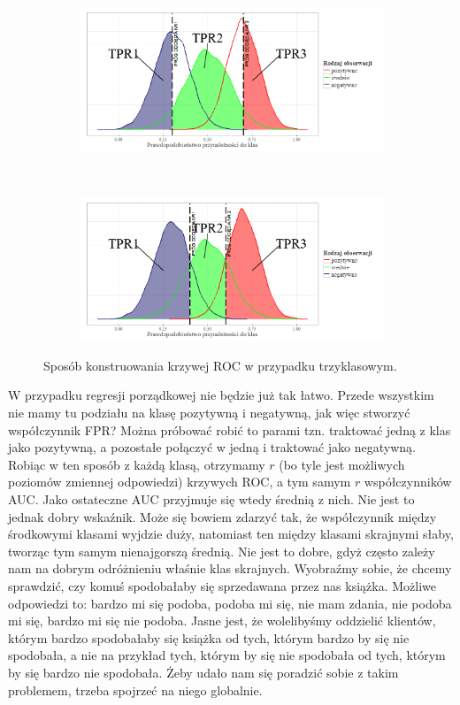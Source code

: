 \documentclass{mini}
\begin{document}
\begin{figure}[h]
	\begin{center}
  \begin{subfigure}[h]{\textwidth}
    \includegraphics[width=\textwidth]{roc_trzy1.png}
  \end{subfigure}\\
  \begin{subfigure}[h]{\textwidth}
    \includegraphics[width=\textwidth]{roc_trzy2.png}
  \end{subfigure}
  \end{center}
  \caption{Sposób konstruowania krzywej ROC w przypadku trzyklasowym.}
  \label{trzyklasowy}
\end{figure}

W przypadku regresji porządkowej nie będzie już tak łatwo. Przede wszystkim nie mamy tu podziału na klasę pozytywną i negatywną, jak więc stworzyć współczynnik FPR? Można próbować robić to parami tzn. traktować jedną z klas jako pozytywną, a pozostałe połączyć w jedną i traktować jako negatywną. Robiąc w ten sposób z każdą klasą, otrzymamy $r$ (bo tyle jest możliwych poziomów zmiennej odpowiedzi) krzywych ROC, a tym samym $r$ współczynników AUC. Jako ostateczne AUC przyjmuje się wtedy średnią z nich. Nie jest to jednak dobry wskaźnik. Może się bowiem zdarzyć tak, że współczynnik między środkowymi klasami wyjdzie duży, natomiast ten między klasami skrajnymi słaby, tworząc tym samym nienajgorszą średnią. Nie jest to dobre, gdyż często zależy nam na dobrym odróżnieniu właśnie klas skrajnych. Wyobraźmy sobie, że chcemy sprawdzić, czy komuś spodobałaby się sprzedawana przez nas książka. Możliwe odpowiedzi to: bardzo mi się podoba, podoba mi się, nie mam zdania, nie podoba mi się, bardzo mi się nie podoba. Jasne jest, że wolelibyśmy oddzielić klientów, którym bardzo spodobałaby się książka od tych, którym bardzo by się nie spodobała, a nie na przykład tych, którym by się nie spodobała od tych, którym by się bardzo nie spodobała. Żeby udało nam się poradzić sobie z takim problemem, trzeba spojrzeć na niego globalnie.   
\end{document}
